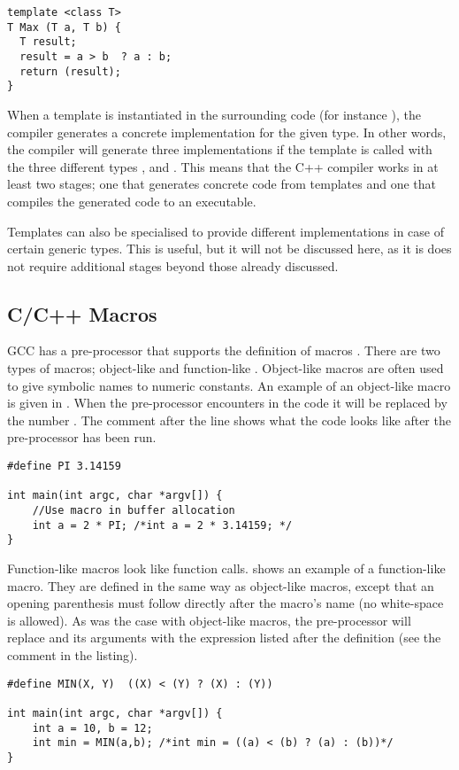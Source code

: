 \begin{lstlisting}[label={lst:c++:max:template}, caption={\ttt{Max}-function template in C++}]
template <class T>
T Max (T a, T b) {
  T result;
  result = a > b  ? a : b;
  return (result);
}
\end{lstlisting}

When a template is instantiated in the surrounding code (for instance ), the compiler generates a concrete implementation for the given type. In other words, the compiler will generate three implementations if the template is called with the three different types ,  and . This means that the C++ compiler works in at least two stages; one that generates concrete code from templates and one that compiles the generated code to an executable.

Templates can also be specialised to provide different implementations in case of certain generic types. This is useful, but it will not be discussed here, as it is does not require additional stages beyond those already discussed.

\subsection{C/C++ Macros}
\ac{GCC} has a pre-processor that supports the definition of macros \cite{c:macros}. There are two types of macros; object-like \cite{c:macros:object} and function-like \cite{c:macros:function}. Object-like macros are often used to give symbolic names to numeric constants. An example of an object-like macro is given in . When the pre-processor encounters  in the code it will be replaced by the number . The comment after the line shows what the code looks like after the pre-processor has been run.
\begin{lstlisting}[label={lst:c:object:macro}, caption={C/C++ object-like macro}, style={C}]
#define PI 3.14159

int main(int argc, char *argv[]) {
    //Use macro in buffer allocation
    int a = 2 * PI; /*int a = 2 * 3.14159; */
}
\end{lstlisting}
Function-like macros look like function calls.  shows an example of a function-like macro. They are defined in the same way as object-like macros, except that an opening parenthesis must follow directly after the macro's name (no white-space is allowed). As was the case with object-like macros, the pre-processor will replace  and its arguments with the expression listed after the definition (see the comment in the listing).
\begin{lstlisting}[label={lst:c:function:macro}, caption={C/C++ function-like macro}, style={C}]
#define MIN(X, Y)  ((X) < (Y) ? (X) : (Y))

int main(int argc, char *argv[]) {
    int a = 10, b = 12;
    int min = MIN(a,b); /*int min = ((a) < (b) ? (a) : (b))*/
}
\end{lstlisting}

